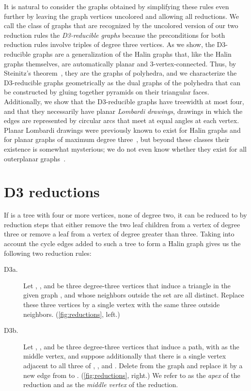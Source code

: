 \documentclass{article}
\begin{document}
It is natural to consider the graphs obtained by simplifying these rules even further by leaving the graph vertices uncolored and allowing all reductions. We call the class of graphs that are recognized by the uncolored version of our two reduction rules the \emph{D3-reducible graphs} because the preconditions for both reduction rules involve triples of degree three vertices. As we show, the D3-reducible graphs are a generalization of the Halin graphs that, like the Halin graphs themselves, are automatically planar and 3-vertex-connected. Thus, by Steinitz's theorem~\cite{Ste-EMW-22}, they are the graphs of polyhedra, and we characterize the D3-reducible graphs geometrically as the dual graphs of the polyhedra that can be constructed by gluing together pyramids on their triangular faces. Additionally, we show that the D3-reducible graphs have treewidth at most four, and that they necessarily have planar \emph{Lombardi drawings}, drawings in which the edges are represented by circular arcs that meet at equal angles at each vertex. Planar Lombardi drawings were previously known to exist for Halin graphs and for planar graphs of maximum degree three~\cite{DunEppGoo-JGAA-12,Epp-DCG-14}, but beyond these classes their existence is somewhat mysterious; we do not even know whether they exist for all outerplanar graphs~\cite{LofNol-GD-12}.

\section{D3 reductions}

If  is a tree with four or more vertices, none of degree two, it can be reduced to  by reduction steps that either remove the two leaf children from a vertex of degree three or remove a leaf from a vertex of degree greater than three. Taking into account the cycle edges added to such a tree to form a Halin graph gives us the following two reduction rules:

\begin{description}
\item[D3a.] Let , , and  be three degree-three vertices that induce a triangle in the given graph , and whose neighbors outside the set  are all distinct. Replace these three vertices by a single vertex with the same three outside neighbors. (\autoref{fig:reductions}, left.)
\item[D3b.] Let , , and  be three degree-three vertices that induce a path, with  as the middle vertex, and suppose additionally that there is a single vertex  adjacent to all three of , , and .
Delete  from the graph and replace it by a new edge from  to . (\autoref{fig:reductions}, right.) We refer to  as the \emph{apex} of the reduction and  as the \emph{middle vertex} of the reduction.
\end{description}
\end{document}
